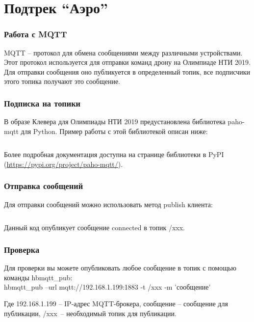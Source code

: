 \section{Подтрек “Аэро”}

\subsubsection*{Работа с MQTT}

MQTT – протокол для обмена сообщениями между различными устройствами. Этот протокол используется для отправки команд дрону на Олимпиаде НТИ 2019. Для отправки сообщения оно публикуется в определенный топик, все подписчики этого топика получают это сообщение.

\subsubsection*{Подписка на топики}

В образе Клевера для Олимпиады НТИ 2019 предустановлена библиотека paho-mqtt для Python. Пример работы с этой библиотекой описан ниже:

\inputminted[fontsize=\footnotesize, linenos]{python}{final/command_tour/ats/task_08/source_1.py}

Более подробная документация доступна на странице библиотеки в PyPI (\url{https://pypi.org/project/paho-mqtt/}).

\subsubsection*{Отправка сообщений}

Для отправки сообщений можно использовать метод publish клиента:

\inputminted[fontsize=\footnotesize, linenos]{python}{final/command_tour/ats/task_08/source_2.py}

Данный код опубликует сообщение connected в топик /xxx.

\subsubsection*{Проверка}

Для проверки вы можете опубликовать любое сообщение в топик с помощью команды hbmqtt\_pub:\\
hbmqtt\_pub --url mqtt://192.168.1.199:1883 -t /xxx -m 'сообщение'

Где 192.168.1.199 – IP-адрес MQTT-брокера, сообщение – сообщение для публикации, /xxx~– необходимый топик для публикации.

